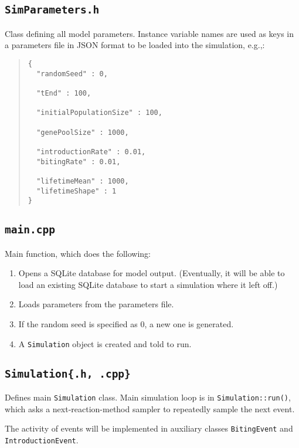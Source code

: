 \documentclass[11pt]{article}
\begin{document}
\subsection{\texttt{SimParameters.h}}

Class defining all model parameters. Instance variable names are used as keys in a parameters file in JSON format to be loaded into the simulation, e.g.,:

\begin{quote}
\begin{verbatim}
{
  "randomSeed" : 0,
  
  "tEnd" : 100,
  
  "initialPopulationSize" : 100,
  
  "genePoolSize" : 1000,
  
  "introductionRate" : 0.01,
  "bitingRate" : 0.01,
  
  "lifetimeMean" : 1000,
  "lifetimeShape" : 1
}
\end{verbatim}
\end{quote}

\subsection{\texttt{main.cpp}}

Main function, which does the following:
\begin{enumerate}
	\item Opens a SQLite database for model output. (Eventually, it will be able to load an existing SQLite database to start a simulation where it left off.)
	\item Loads parameters from the parameters file.
	\item If the random seed is specified as 0, a new one is generated.
	\item A \texttt{Simulation} object is created and told to run.
\end{enumerate}

\subsection{\texttt{Simulation\{.h, .cpp\}}}

Defines main \texttt{Simulation} class. Main simulation loop is in \texttt{Simulation::run()}, which asks a next-reaction-method sampler to repeatedly sample the next event.

The activity of events will be implemented in auxiliary classes \texttt{BitingEvent} and \texttt{IntroductionEvent}.
\end{document}
